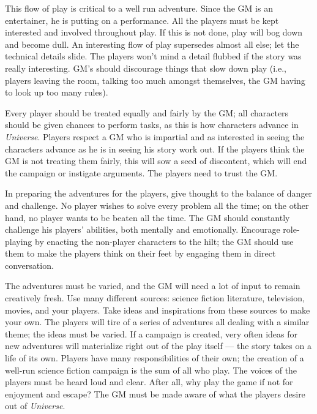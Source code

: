 This flow of play is critical to a well run adventure.  Since the GM
is an entertainer, he is putting on a performance.  All the players
must be kept interested and involved throughout play.  If this is not
done, play will bog down and become dull.  An interesting flow of play
supersedes almost all else; let the technical details slide.  The
players won't mind a detail flubbed if the story was really
interesting.  GM's should discourage things that slow down play (i.e.,
players leaving the room, talking too much amongst themselves, the GM
having to look up too many rules).

Every player should be treated equally and fairly by the GM; all
characters should be given chances to perform tasks, as this is how
characters advance in \emph{Universe}.  Players respect a GM who is
impartial and as interested in seeing the characters advance as he is
in seeing his story work out.  If the players think the GM is not
treating them fairly, this will sow a seed of discontent, which will
end the campaign or instigate arguments.  The players need to trust
the GM.

In preparing the adventures for the players, give thought to the
balance of danger and challenge.  No player wishes to solve every
problem all the time; on the other hand, no player wants to be beaten
all the time.  The GM should constantly challenge his players'
abilities, both mentally and emotionally.  Encourage role-playing by
enacting the non-player characters to the hilt; the GM should use them
to make the players think on their feet by engaging them in direct
conversation.

The adventures must be varied, and the GM will need a lot of input to
remain creatively fresh.  Use many different sources: science fiction
literature, television, movies, and your players.  Take ideas and
inspirations from these sources to make your own.  The players will
tire of a series of adventures all dealing with a similar theme; the
ideas must be varied.  If a campaign is created, very often ideas for
new adventures will materialize right out of the play itself --- the
story takes on a life of its own.  Players have many responsibilities
of their own; the creation of a well-run science fiction campaign is
the sum of all who play.  The voices of the players must be heard loud
and clear.  After all, why play the game if not for enjoyment and
escape? The GM must be made aware of what the players desire out of
\emph{Universe}.

